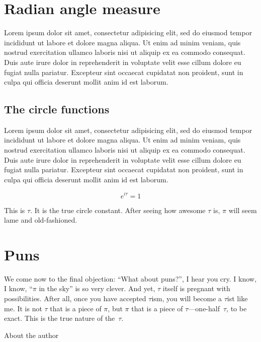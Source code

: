 \documentclass{article}
\begin{document}
\section{Radian angle measure} %
\label{sec:radian_angle_measure}

Lorem ipsum dolor sit amet, consectetur adipisicing elit, sed do eiusmod tempor incididunt ut labore et dolore magna aliqua. Ut enim ad minim veniam, quis nostrud exercitation ullamco laboris nisi ut aliquip ex ea commodo consequat. Duis aute irure dolor in reprehenderit in voluptate velit esse cillum dolore eu fugiat nulla pariatur. Excepteur sint occaecat cupidatat non proident, sunt in culpa qui officia deserunt mollit anim id est laborum.

  \subsection{The circle functions} %
  \label{sec:the_circle_functions}
  
Lorem ipsum dolor sit amet, consectetur adipisicing elit, sed do eiusmod tempor incididunt ut labore et dolore magna aliqua. Ut enim ad minim veniam, quis nostrud exercitation ullamco laboris nisi ut aliquip ex ea commodo consequat. Duis aute irure dolor in reprehenderit in voluptate velit esse cillum dolore eu fugiat nulla pariatur. Excepteur sint occaecat cupidatat non proident, sunt in culpa qui officia deserunt mollit anim id est laborum.
  


\[ e^{i\tau} = 1 \]


This is $\tau$. It is the true circle constant. After seeing how awesome $\tau$ is, $\pi$ will seem lame and old-fashioned.

\section{Puns}

We come now to the final objection: ``What about puns?'', I hear you cry. I know, I know, ``$\pi$ in the sky'' is so very clever. And yet, $\tau$ itself is pregnant with possibilities. After all, once you have accepted $\tau$ism, you will become a $\tau$ist like me. It is not $\tau$ that is a piece of $\pi$, but $\pi$ that is a piece of $\tau$---one-half~$\tau$, to be exact. This is the true nature of the~$\tau$.

About the author
\end{document}
